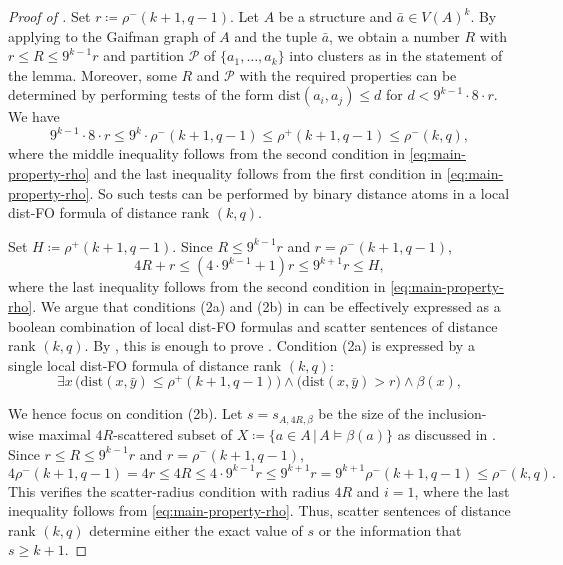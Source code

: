 \documentclass[11pt]{article}
\newcommand{\eqdef}{\coloneqq}
\theoremstyle{remark}
\newcommand{\set}[1]{\{#1\}}
\newcommand{\setof}[2]{\set{#1 \,|\, #2 }}
\def\cal{\mathcal}
\renewcommand{\le}{\leqslant}
\renewcommand{\ge}{\geqslant}
\newcommand{\dist}{\mathrm{dist}}
\newcommand{\distFO}{\textrm{\upshape dist-FO}\xspace}
\newcommand{\tup}{\bar}
\begin{document}
\begin{proof}[Proof of ]
    Set $r\eqdef \rho^-(k+1,q-1)$.
    Let $A$ be a structure and $\tup a\in V(A)^k$.
    By applying  to the Gaifman graph of $A$ and the tuple $\tup a$, we obtain
    a number $R$ with $r\le R\le 9^{k-1}r$ and partition $\cal P$ of $\set{a_1,\ldots,a_k}$ into clusters as in the statement of the lemma. Moreover, some
    $R$ and $\cal P$ with the required properties
    can be determined
    by performing tests of the form
    $\dist(a_i,a_j)\le d$ for $d<9^{k-1}\cdot 8\cdot r$. We have
    $$9^{k-1} \cdot 8\cdot  r\le 9^{k}\cdot  \rho^-(k+1,q-1)\le \rho^+(k+1,q-1)\le \rho^-(k,q),$$
         where the middle inequality follows from the second condition in \eqref{eq:main-property-rho}
         and the last inequality follows from the first condition in \eqref{eq:main-property-rho}.
So such tests can be performed by binary distance atoms in a local \distFO formula of distance rank $(k,q)$.


Set $H\coloneqq \rho^+(k+1,q-1)$. Since $R\le 9^{k-1}r$ and
\(r=\rho^-(k+1,q-1)\),
\[
    4R+r\le (4\cdot 9^{k-1}+1)r\le 9^{k+1}r\le H,
\]
where the last inequality follows from the second condition in \eqref{eq:main-property-rho}.
    We argue that conditions (2a) and (2b) in  can be effectively expressed
    as a boolean combination of local \distFO formulas and scatter sentences of distance rank \((k,q)\).
    By ,
    this is enough to
    prove .
    Condition (2a)
    is expressed by
     a single local \distFO formula of distance rank $(k,q)$:
    \[
\exists x\,
\bigl(\dist(x,\bar y)\le \rho^+(k+1,q-1)\bigr)
\land
\bigl(\dist(x,\bar y)>r\bigr)
\land
\beta(x),
\]

    We hence focus on condition (2b).
    Let \(s=s_{A,4R,\beta}\) be the size of the inclusion-wise maximal \(4R\)-scattered subset of $X\eqdef\setof{a\in A}{A\models \beta(a)}$ as discussed in .
    Since \(r\le R\le 9^{k-1}r\) and \(r=\rho^-(k+1,q-1)\),
\[
4\rho^-(k+1,q-1)=4r\le 4R
\le 4\cdot 9^{k-1}r
\le 9^{k+1}r
=
9^{k+1}\rho^-(k+1,q-1)
\le \rho^-(k,q).
\]
This verifies the scatter-radius condition with radius \(4R\) and \(i=1\), where the last inequality follows from \eqref{eq:main-property-rho}.
     Thus,
    scatter sentences of distance rank \((k,q)\) determine either the exact value of \(s\) or the information that \(s \ge k+1\).


\end{proof}
\end{document}
